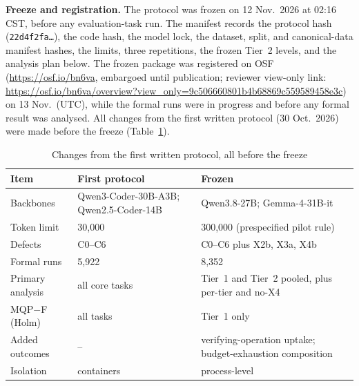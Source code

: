 \documentclass[conference]{IEEEtran}
\newcommand{\sys}[1]{\textsf{#1}}
\begin{document}
\textbf{Freeze and registration.} The protocol was frozen on 12 Nov.\ 2026 at 02:16 CST, before any evaluation-task
run. The manifest records the protocol hash (\texttt{22d4f2fa\ldots}), the code hash, the model lock, the dataset,
split, and canonical-data manifest hashes, the limits, three repetitions, the frozen Tier~2 levels, and the analysis
plan below. The frozen package was registered on OSF (\url{https://osf.io/bn6va}, embargoed until publication; reviewer view-only link: \url{https://osf.io/bn6va/overview?view_only=9c506660801b4b68869c559589458e3c}) on
13 Nov.\ (UTC), while the formal runs were in progress and before any formal result was analysed. All changes from
the first written protocol (30 Oct.\ 2026) were made before the freeze (Table~\ref{tab:deviations}).

\begin{table}[t]
\caption{Changes from the first written protocol, all before the freeze}
\label{tab:deviations}
\centering\footnotesize\setlength{\tabcolsep}{3pt}
\begin{tabular}{@{}p{}p{}p{}@{}}
\toprule
Item & First protocol & Frozen \\
\midrule
Backbones & Qwen3-Coder-30B-A3B; Qwen2.5-Coder-14B & Qwen3.8-27B; Gemma-4-31B-it \\
Token limit & 30,000 & 300,000 (prespecified pilot rule) \\
Defects & C0--C6 & C0--C6 plus X2b, X3a, X4b \\
Formal runs & 5,922 & 8,352 \\
Primary analysis & all core tasks & Tier~1 and Tier~2 pooled, plus per-tier and no-X4 \\
\sys{MQP}$-$\sys{F} (Holm) & all tasks & Tier~1 only \\
Added outcomes & -- & verifying-operation uptake; budget-exhaustion composition \\
Isolation & containers & process-level \\
\bottomrule
\end{tabular}
\end{table}
\end{document}
